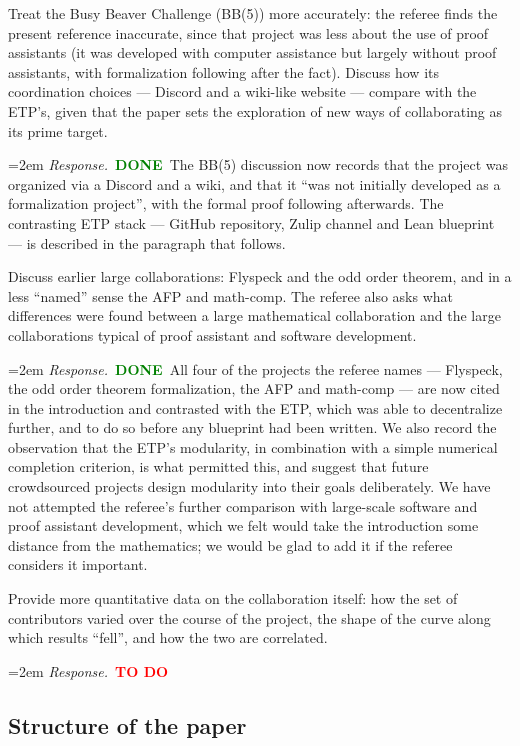 \documentclass[11pt]{amsart}
\newcommand{\todo}{\textcolor{red}{\textbf{TO DO}}}
\newcommand{\done}{\textcolor{green}{\textbf{DONE}}}
\newcommand{\response}[1]{%
  \par\smallskip
  \noindent\hangindent=2em\hangafter=1
  \textit{Response.}\ #1
  \par\smallskip}
\begin{document}
\begin{requests}[resume]
\item Treat the Busy Beaver Challenge (BB(5)) more accurately: the referee finds the
present reference inaccurate, since that project was less about the use of proof
assistants (it was developed with computer assistance but largely without proof
assistants, with formalization following after the fact). Discuss how its coordination
choices --- Discord and a wiki-like website --- compare with the ETP's, given that the
paper sets the exploration of new ways of collaborating as its prime target.
\response{\done\ The BB(5) discussion now records that the project was organized via a
Discord and a wiki, and that it ``was not initially developed as a formalization
project'', with the formal proof following afterwards. The contrasting ETP stack ---
GitHub repository, Zulip channel and Lean blueprint --- is described in the paragraph
that follows.}

\item Discuss earlier large collaborations: Flyspeck and the odd order theorem, and in
a less ``named'' sense the AFP and math-comp. The referee also asks what differences
were found between a large mathematical collaboration and the large collaborations
typical of proof assistant and software development.
\response{\done\ All four of the projects the referee names --- Flyspeck, the odd order
theorem formalization, the AFP and math-comp --- are now cited in the introduction and
contrasted with the ETP, which was able to decentralize further, and to do so before any
blueprint had been written. We also record the observation that the ETP's modularity, in
combination with a simple numerical completion criterion, is what permitted this, and
suggest that future crowdsourced projects design modularity into their goals deliberately.
We have not attempted the referee's further comparison with large-scale software and proof
assistant development, which we felt would take the introduction some distance from the
mathematics; we would be glad to add it if the referee considers it important.}

\item Provide more quantitative data on the collaboration itself: how the set of
contributors varied over the course of the project, the shape of the curve along which
results ``fell'', and how the two are correlated.
\response{\todo}

\end{requests}

\subsection*{Structure of the paper}
\end{document}
